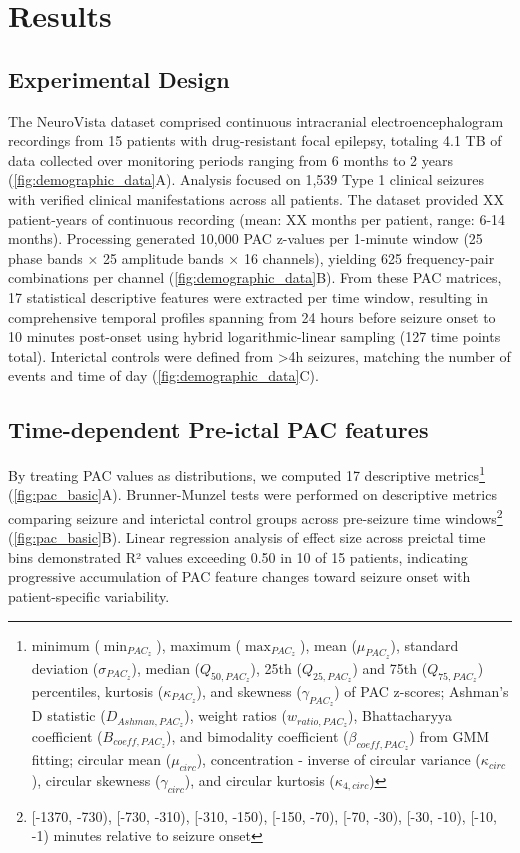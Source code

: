\section{Results}

\subsection{Experimental Design}
The NeuroVista dataset \cite{kuhlmann_epilepsyecosystemorg_2018} comprised continuous intracranial electroencephalogram recordings from 15 patients with drug-resistant focal epilepsy, totaling 4.1 TB of data collected over monitoring periods ranging from 6 months to 2 years (\ref{fig:demographic_data}A). Analysis focused on 1,539 Type 1 clinical seizures with verified clinical manifestations across all patients. The dataset provided XX patient-years of continuous recording (mean: XX months per patient, range: 6-14 months). Processing generated 10,000 PAC z-values per 1-minute window (25 phase bands × 25 amplitude bands × 16 channels), yielding 625 frequency-pair combinations per channel (\ref{fig:demographic_data}B). From these PAC matrices, 17 statistical descriptive features were extracted per time window, resulting in comprehensive temporal profiles spanning from 24 hours before seizure onset to 10 minutes post-onset using hybrid logarithmic-linear sampling (127 time points total). Interictal controls were defined from >4h seizures, matching the number of events and time of day (\ref{fig:demographic_data}C).

\subsection{Time-dependent Pre-ictal PAC features}
By treating PAC values as distributions, we computed 17 descriptive metrics\footnote{minimum ($\min_{{PAC}_z}$), maximum ($\max_{{PAC}_z}$), mean ($\mu_{{PAC}_z}$), standard deviation ($\sigma_{{PAC}_z}$), median ($Q_{50,{PAC}_z}$), 25th ($Q_{25,{PAC}_z}$) and 75th ($Q_{75,{PAC}_z}$) percentiles, kurtosis ($\kappa_{{PAC}_z}$), and skewness ($\gamma_{{PAC}_z}$) of PAC z-scores; Ashman's D statistic ($D_{Ashman,{PAC}_z}$), weight ratios ($w_{ratio,{PAC}_z}$), Bhattacharyya coefficient ($B_{coeff,{PAC}_z}$), and bimodality coefficient ($\beta_{coeff,{PAC}_z}$) from GMM fitting; circular mean ($\mu_{circ}$), concentration - inverse of circular variance ($\kappa_{circ}$), circular skewness ($\gamma_{circ}$), and circular kurtosis ($\kappa_{4,circ}$)} (\ref{fig:pac_basic}A). Brunner-Munzel tests were performed on descriptive metrics comparing seizure and interictal control groups across pre-seizure time windows\footnote{[-1370, -730), [-730, -310), [-310, -150), [-150, -70), [-70, -30), [-30, -10), [-10, -1) minutes relative to seizure onset} (\ref{fig:pac_basic}B). Linear regression analysis of effect size across preictal time bins demonstrated R² values exceeding 0.50 in 10 of 15 patients, indicating progressive accumulation of PAC feature changes toward seizure onset with patient-specific variability.
                  
